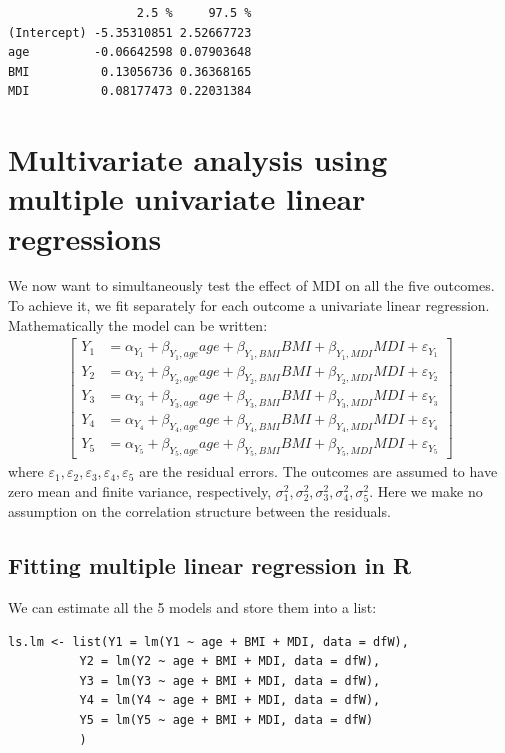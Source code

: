 \documentclass{article}
\newcommand\Rlogo{\textbf{\textsf{R}}}
\begin{document}
\begin{verbatim}
                  2.5 %     97.5 %
(Intercept) -5.35310851 2.52667723
age         -0.06642598 0.07903648
BMI          0.13056736 0.36368165
MDI          0.08177473 0.22031384
\end{verbatim}

\clearpage

\section{Multivariate analysis using multiple univariate linear regressions}
\label{sec:multipleLM}
We now want to simultaneously test the effect of MDI on all the five
outcomes. To achieve it, we fit separately for each outcome a
univariate linear regression. Mathematically the model can be written:
\begin{align*}
\begin{bmatrix} 
Y_1  &= \alpha_{Y_{1}} + \beta_{Y_1,age} age + \beta_{Y_1,BMI} BMI + \beta_{Y_1,MDI} MDI + \varepsilon_{Y_1} \\
Y_2  &= \alpha_{Y_{2}} + \beta_{Y_2,age} age + \beta_{Y_2,BMI} BMI + \beta_{Y_2,MDI} MDI + \varepsilon_{Y_2} \\
Y_3  &= \alpha_{Y_{3}} + \beta_{Y_3,age} age + \beta_{Y_3,BMI} BMI + \beta_{Y_3,MDI} MDI + \varepsilon_{Y_3} \\
Y_4  &= \alpha_{Y_{4}} + \beta_{Y_4,age} age + \beta_{Y_4,BMI} BMI + \beta_{Y_4,MDI} MDI + \varepsilon_{Y_4} \\
Y_5  &= \alpha_{Y_{5}} + \beta_{Y_5,age} age + \beta_{Y_5,BMI} BMI + \beta_{Y_5,MDI} MDI + \varepsilon_{Y_5} 
\end{bmatrix} 
\end{align*}
where
\(\varepsilon_{1},\varepsilon_{2},\varepsilon_{3},\varepsilon_{4},\varepsilon_{5}\)
are the residual errors. The outcomes are assumed to have zero mean
and finite variance, respectively,
\(\sigma^2_{1},\sigma^2_{2},\sigma^2_{3},\sigma^2_{4},\sigma^2_{5}\). Here
we make no assumption on the correlation structure between the
residuals.

\subsection{Fitting multiple linear regression in \Rlogo{}}
\label{sec:org6170c81}

We can estimate all the 5 models and store them into a list:
\lstset{language=r,label= ,caption= ,captionpos=b,numbers=none}
\begin{lstlisting}
ls.lm <- list(Y1 = lm(Y1 ~ age + BMI + MDI, data = dfW),
	      Y2 = lm(Y2 ~ age + BMI + MDI, data = dfW),
	      Y3 = lm(Y3 ~ age + BMI + MDI, data = dfW),
	      Y4 = lm(Y4 ~ age + BMI + MDI, data = dfW),
	      Y5 = lm(Y5 ~ age + BMI + MDI, data = dfW)
	      )
\end{lstlisting}
\end{document}
